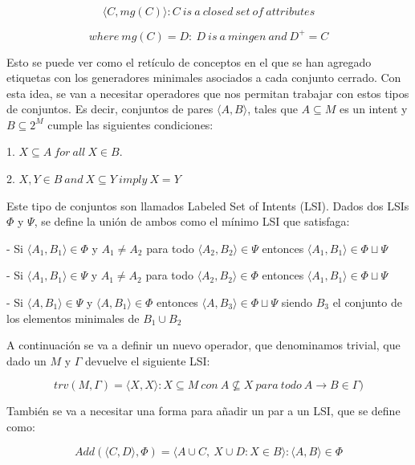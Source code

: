     \[
        {\langle C, mg(C) \rangle : C ~ is ~ a ~ closed ~ set ~ of ~ attributes}    
    \]

    \[
        where ~ mg(C) = {D: ~ D ~ is ~ a ~ mingen ~ and ~ D^+ = C}    
    \]

    Esto se puede ver como el ret\'iculo de conceptos en el que se han agregado etiquetas con los generadores minimales asociados a cada conjunto cerrado.
    Con esta idea, se van a necesitar operadores que nos permitan trabajar con estos tipos de conjuntos. Es decir, conjuntos de pares 
    \( \langle A, B \rangle \), tales que \( A \subseteq M\) es un intent y \( B \subseteq 2^M\) cumple las siguientes condiciones:

    1. \(X \subseteq A ~ for ~ all ~ X \in B\).

    2. \(X,Y \in B ~ and ~ X \subseteq Y ~ imply ~ X = Y\)

    Este tipo de conjuntos son llamados Labeled Set of Intents (LSI). Dados dos LSIs \(\Phi\) y \(\Psi\), se define la uni\'on de ambos como 
    el m\'inimo LSI que satisfaga:
    
    - Si \( \langle A_{1}, B_{1} \rangle \in \Phi \) y \(A_{1} \neq A_{2} \) para todo \( \langle A_{2}, B_{2} \rangle \in \Psi \) 
    entonces \( \langle A_{1}, B_{1} \rangle \in \Phi \sqcup \Psi \)
    
    - Si \( \langle A_{1}, B_{1} \rangle \in \Psi \) y \(A_{1} \neq A_{2} \) para todo \( \langle A_{2}, B_{2} \rangle \in \Phi \) 
    entonces \( \langle A_{1}, B_{1} \rangle \in \Phi \sqcup \Psi \)
    
    - Si \( \langle A, B_{1} \rangle \in \Psi \) y \( \langle A, B_{1} \rangle \in \Phi \) entonces \( \langle A, B_{3} \rangle \in \Phi \sqcup \Psi \) 
    siendo \(B_{3}\) el conjunto de los elementos minimales de \(B_{1} \cup B_{2}\)

    
    A continuaci\'on se va a definir un nuevo operador, que denominamos trivial, que dado un \(M\) y \(\Gamma\) devuelve el siguiente LSI:


    \[
        trv(M, \Gamma) = {\langle X, {X} \rangle: X \subseteq M ~ con ~ A \not \subseteq X ~ para ~ todo ~ A \rightarrow B \in \Gamma} )    
    \]

    Tambi\'en se va a necesitar una forma para a\~nadir un par a un LSI, que se define como:

    \[
        Add(\langle C, {D} \rangle, \Phi) = {\langle A \cup C, ~ {X \cup D: X \in B} \rangle : \langle A, B\rangle \in \Phi}    
    \]


